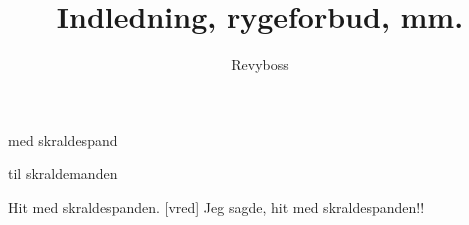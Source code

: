 \documentclass[11pt]{article}
\title{Indledning, rygeforbud, mm.}
\author{Revyboss}
\begin{document}
\maketitle

\begin{sketch}

\begin{roles}
   med skraldespand
\end{roles}

\begin{props}
   til skraldemanden
\end{props}

 Hit med skraldespanden.
 [vred] Jeg sagde, hit med skraldespanden!!

\end{sketch}
\end{document}
